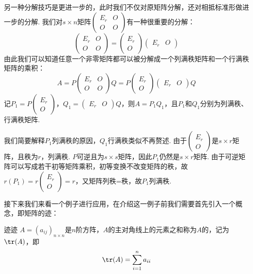 另一种分解技巧是更进一步的，此时我们不仅对原矩阵分解，还对相抵标准形做进一步的分解. 我们对$s \times n$矩阵$\begin{pmatrix}
        E_r & O \\ O & O
    \end{pmatrix}$有一种很重要的分解：
\[\begin{pmatrix}
        E_r & O \\ O & O
    \end{pmatrix}=\begin{pmatrix}
        E_r \\ O
    \end{pmatrix}\begin{pmatrix}
        E_r & O
    \end{pmatrix}\]
由此我们可以知道任意一个非零矩阵都可以被分解成一个列满秩矩阵和一个行满秩矩阵的乘积：
\[A=P\begin{pmatrix}
        E_r & O \\ O & O
    \end{pmatrix}Q=P\begin{pmatrix}
        E_r \\ O
    \end{pmatrix}\begin{pmatrix}
        E_r & O
    \end{pmatrix}Q\]
记$P_1=P\begin{pmatrix}
        E_r \\ O
    \end{pmatrix}$，$Q_1=\begin{pmatrix}
        E_r & O
    \end{pmatrix}Q$，则$A=P_1Q_1$，且$P_1$和$Q_1$分别为列满秩、行满秩矩阵.

我们简要解释$P_1$列满秩的原因，$Q_1$行满秩类似不再赘述. 由于$\begin{pmatrix}
        E_r \\ O
    \end{pmatrix}$是$s\times r$矩阵，且秩为$r$，列满秩. $P$可逆且为$s\times s$矩阵，因此$P_1$仍然是$s\times r$矩阵. 由于可逆矩阵可以写成若干初等矩阵乘积，初等变换不改变矩阵的秩，故$r(P_1)=r\begin{pmatrix}
        E_r \\ O
    \end{pmatrix}=r$，又矩阵列秩=秩，故$P_1$列满秩.

接下来我们来看一个例子进行应用，在介绍这一例子前我们需要首先引入一个概念，即矩阵的迹：
\begin{definition}{迹}{迹} 
    $A=(a_{ij})_{n\times n}$是$n$阶方阵，$A$的主对角线上的元素之和称为$A$的，记为$\tr(A)$，即
    \[\tr(A)=\sum_{i=1}^n a_{ii}\]
\end{definition}

